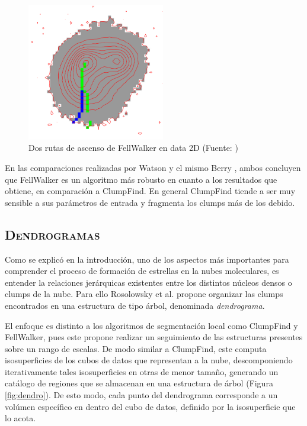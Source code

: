 \documentclass[letter, 11pt]{article}
\begin{document}
\begin{figure}[htpb!]
\centering
\includegraphics[width=6cm]{fw}
\caption{Dos rutas de ascenso de FellWalker en data 2D (Fuente: \cite{Berry})}
\label{fig:fw}
\end{figure}

En las comparaciones realizadas por Watson \cite{Watson} y el mismo Berry \cite{Berry}, ambos concluyen que FellWalker es un algoritmo más robusto en cuanto a los resultados que obtiene, en comparación a ClumpFind. En general ClumpFind tiende a ser muy sensible a sus parámetros de entrada y fragmenta los clumps más de los debido.  


\subsection{\textsc{Dendrogramas}}

Como se explicó en la introducción, uno de los aspectos más importantes para comprender el proceso de formación de estrellas en la nubes moleculares, es entender la relaciones jerárquicas existentes entre los distintos núcleos densos o clumps de la nube. Para ello Rosolowsky et al. \cite{Rosolowsky} propone organizar las clumps encontrados en una estructura de tipo árbol, denominada \textit{dendrograma}.

El enfoque es distinto a los algoritmos de segmentación local como ClumpFind y FellWalker, pues este propone realizar un seguimiento de las estructuras presentes sobre un rango de escalas. De modo similar a ClumpFind, este computa isosuperficies de los cubos de datos que representan a la nube, descomponiendo iterativamente tales isosuperficies en otras de menor tamaño, generando un catálogo de regiones que se almacenan en una estructura de árbol (Figura \ref{fig:dendro}). De esto modo, cada punto del dendrograma corresponde a un volúmen específico en dentro del cubo de datos, definido por la isosuperficie que lo acota.  
\end{document}
